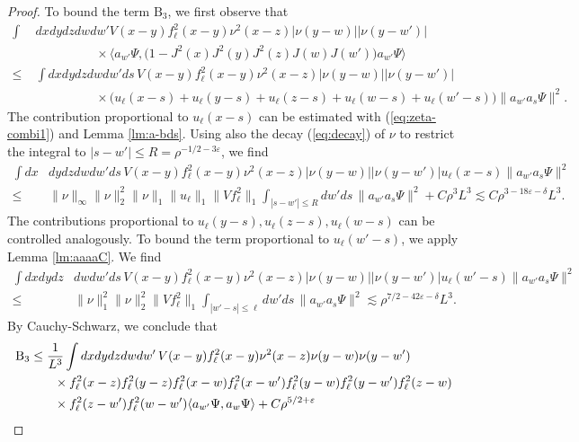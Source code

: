 \documentclass[a4paper,11pt]{article}
\def\eps{\varepsilon}
\numberwithin{equation}{section}
\begin{document}
\begin{proof}
To bound the term $\text{B}_3$, we first observe that 
\[\begin{split}  \int &dx dy dz dw dw' V(x-y) f_\ell^2(x-y)\nu^2 (x-z) |\nu (y-w)| |\nu (y-w')|\\ &\hspace{2cm} \times \langle a_{w'} \Psi, \big( 1 - J^2 (x) J^2 (y) J^2 (z) J(w) J(w') \big) a_{w'} \Psi \rangle \\ \leq \; &\int dx dy dz dw dw'ds \, V(x-y) f_\ell^2(x-y)\nu^2 (x-z) |\nu (y-w)| | \nu (y-w')| \\ &\hspace{2cm} \times \big( u_\ell (x-s) + u_\ell (y-s) + u_\ell (z-s) + u_\ell (w-s) + u_\ell (w' -s) \big) \| a_{w'} a_s \Psi \|^2. \end{split} \]
The contribution proportional to $u_\ell (x-s)$ can be estimated with (\ref{eq:zeta-combi1}) and Lemma \ref{lm:a-bds}. Using also the decay (\ref{eq:decay}) of $\nu$ to restrict the integral to $|s-w'| \leq R = \rho^{-1/2-3\eps}$,  we find  
\[ \begin{split}  \int dx &dy dz dw dw' ds \, V(x-y)f_\ell^2(x-y) \nu^2 (x-z) |\nu (y-w)| | \nu (y-w')| u_\ell (x-s) \| a_{w'} a_s \Psi \|^2 \\  \leq \; & \| \nu \|_\infty \| \nu \|_2^2 \| \nu \|_1 \| u_\ell \|_1 \|Vf_\ell^2\|_1\int_{|s-w'| \leq R} dw' ds \, \| a_{w'} a_s \Psi \|^2 + C \rho^3 L^3 \lesssim C \rho^{3-18\eps-\delta} L^3.  \end{split} \]
The contributions proportional to $u_\ell (y-s), u_\ell (z-s), u_\ell (w-s)$ can be controlled analogously. To bound the term proportional to $u_\ell (w'-s)$, we apply Lemma \ref{lm:aaaaC}. We find 
\[ \begin{split}  \int dx dy dz &dw dw' ds \, V(x-y)f_\ell^2(x-y) \nu^2 (x-z) |\nu (y-w)| | \nu (y-w')| u_\ell (w'-s) \| a_{w'} a_s \Psi \|^2 \\  \leq \; & \| \nu \|^2_1 \| \nu \|_2^2 \|Vf_\ell^2\|_1\int_{|w'-s| \leq \ell} dw'ds \, \| a_{w'} a_s \Psi \|^2 \lesssim \rho^{7/2-42\eps-\delta} L^3. \end{split} \]
By Cauchy-Schwarz, we conclude that 
\[ \begin{split} \text{B}_3 \leq \; &\frac{1}{L^3} \int  dx dy dz dw dw' \, V(x-y) f_\ell^2 (x-y) \nu^2 (x-z) \nu (y-w) \nu (y-w') \\ &\hspace{.2cm} \times 
f_\ell^2(x-z) f_\ell^2 (y-z) f_\ell^2 (x-w) f_\ell^2 (x-w') f_\ell^2 (y-w) f_\ell^2 (y-w') f_\ell^2 (z-w) \\ &\hspace{.2cm} \times f_\ell^2 (z-w') f_\ell^2 (w-w') \langle a_{w'} \Psi,  a_w \Psi \rangle  + C \rho^{5/2+\eps} \end{split} \]

\end{proof}
\end{document}

